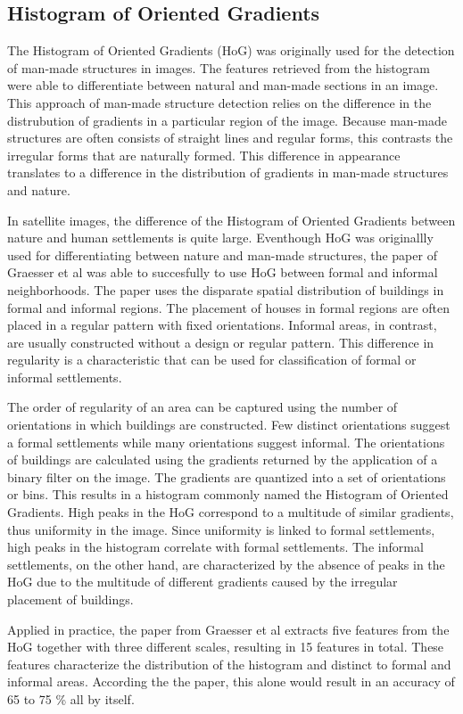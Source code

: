 \subsection{Histogram of Oriented Gradients}


The Histogram of Oriented Gradients (HoG) was originally used for the detection of
man-made structures in images. The features retrieved from the histogram were
able to differentiate between natural and man-made sections in an image. This
approach of man-made structure detection relies on the difference in the
distrubution of gradients in a particular region of the image. Because man-made
structures are often consists of straight lines and regular forms, this
contrasts the irregular forms that are naturally formed. This difference in
appearance translates to a difference in the distribution of gradients in
man-made structures and nature.

In satellite images, the difference of the Histogram of Oriented Gradients
between nature and human settlements is quite large. Eventhough HoG was
originallly used for differentiating between nature and man-made structures,
the paper of Graesser et al was able to succesfully to use HoG between formal
and informal neighborhoods. The paper uses the disparate spatial distribution of
buildings in formal and informal regions. The
placement of houses in formal regions are often placed in a regular pattern
with fixed orientations. Informal areas, in contrast, are usually constructed
without a design or regular pattern. This difference in regularity is
a characteristic that can be used for classification of formal or informal
settlements.

The order of regularity of an area can be captured using the number of
orientations in which buildings are constructed. Few distinct orientations suggest
a formal settlements while many orientations suggest informal. The orientations
of buildings are calculated using the gradients returned by the application of
a binary filter on the image. The gradients are quantized into a set of
orientations or bins. This results in a histogram commonly named the Histogram
of Oriented Gradients. High peaks in the HoG correspond to a multitude of
similar gradients, thus uniformity in the image. Since uniformity is linked
to formal settlements, high peaks in the histogram correlate with formal
settlements. The informal settlements, on the other hand, are characterized by
the absence of peaks in the HoG due to the multitude of different gradients
caused by the irregular placement of buildings.



Applied in practice, the paper from Graesser et al extracts five features from
the HoG together with three different scales, resulting in 15 features in
total. These features characterize the distribution of the histogram and
distinct to formal and informal areas. According the the paper, this alone would
result in an accuracy of 65 to 75 \% all by itself.

